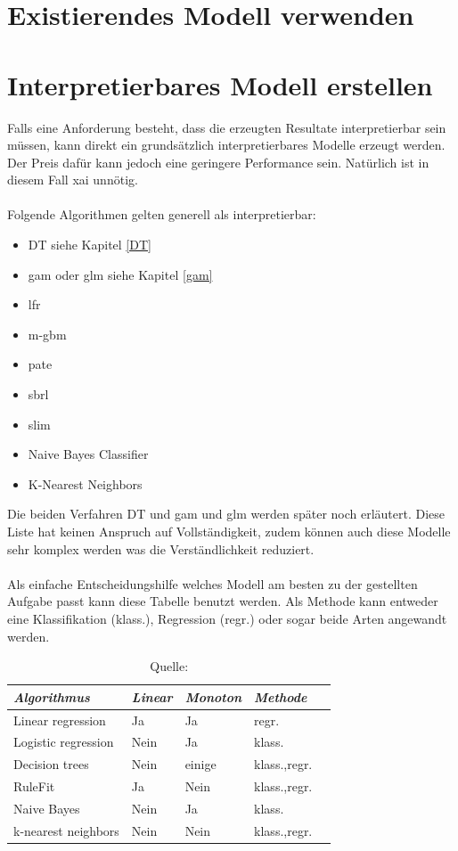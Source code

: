\documentclass[
  12pt, %
  a4paper, %
  oneside, %
  openany, 
  numbers=noenddot, %
  BCOR=5mm, %
  parskip=half*, %
  thesis, %
]{bfhbook}
\begin{document}
\section{Existierendes Modell verwenden}

\section{Interpretierbares Modell erstellen}

Falls eine Anforderung besteht, dass die erzeugten Resultate interpretierbar sein müssen, kann direkt ein grundsätzlich interpretierbares Modelle erzeugt werden. Der Preis dafür kann jedoch eine geringere Performance sein. Natürlich ist in diesem Fall \Gls{xai} unnötig.
\\
\\
Folgende Algorithmen gelten generell als interpretierbar:
\begin{itemize}
	\item \Gls{DT} siehe Kapitel \ref{DT}
	\item \acrfull{gam} oder \acrfull{glm} siehe Kapitel \ref{gam}
	\item \acrfull{lfr}
	\item \acrfull{m-gbm}
	\item \acrfull{pate}	
	\item \acrfull{sbrl}
	\item \acrfull{slim}
	\item Naive Bayes Classifier
	\item K-Nearest Neighbors
\end{itemize}
Die beiden Verfahren \Gls{DT} und \acrshort{gam} und \acrshort{glm} werden später noch erläutert.  Diese Liste hat keinen Anspruch auf Vollständigkeit, zudem können auch diese Modelle sehr komplex werden was die Verständlichkeit reduziert.
\\\\
Als einfache Entscheidungshilfe welches Modell am besten zu der gestellten Aufgabe passt kann diese Tabelle benutzt werden. Als Methode kann entweder eine Klassifikation (klass.), Regression (regr.) oder sogar beide Arten angewandt werden.  \\
\begin{table}[ht]
\begin{tabular}{@{} *5l @{}}    \toprule
	\emph{Algorithmus} & \emph{Linear} & \emph{Monoton} & \emph{Methode}  \\\midrule
	Linear regression & Ja & Ja & 	regr. \\
	Logistic regression & Nein & Ja & 	klass. \\
	Decision trees & Nein & einige &	klass.,regr. \\
	RuleFit & Ja & Nein & 	klass.,regr. \\
	Naive Bayes	 & Nein & Ja & 	klass. \\
	k-nearest neighbors & Nein & Nein & klass.,regr. \\ \bottomrule
	 \hline
\end{tabular}
\caption*{Quelle: \parencite{iML}}
\end{table}
\end{document}
